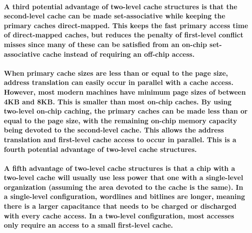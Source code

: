 \documentclass{article}
\begin{document}
\paragraph{A third potential advantage of two-level cache structures is that the second-level cache can be
made set-associative while keeping the primary caches direct-mapped. This keeps the fast
primary access time of direct-mapped caches, but reduces the penalty of first-level conflict
misses since many of these can be satisfied from an on-chip set-associative cache instead of
requiring an off-chip access.}

\paragraph{When primary cache sizes are less than or equal to the page size, address translation can easily
occur in parallel with a cache access. However, most modern machines have minimum page
sizes of between 4KB and 8KB. This is smaller than most on-chip caches. By using two-level
on-chip caching, the primary caches can be made less than or equal to the page size, with the
remaining on-chip memory capacity being devoted to the second-level cache. This allows the
address translation and first-level cache access to occur in parallel. This is a fourth potential advantage of 
two-level cache structures.}

\paragraph{A fifth advantage of two-level cache structures is that a chip with a two-level cache will
usually use less power that one with a single-level organization (assuming the area devoted to the
cache is the same). In a single-level configuration, wordlines and bitlines are longer, meaning
there is a larger capacitance that needs to be charged or discharged with every cache access. In a
two-level configuration, most accesses only require an access to a small first-level cache.}
\end{document}
